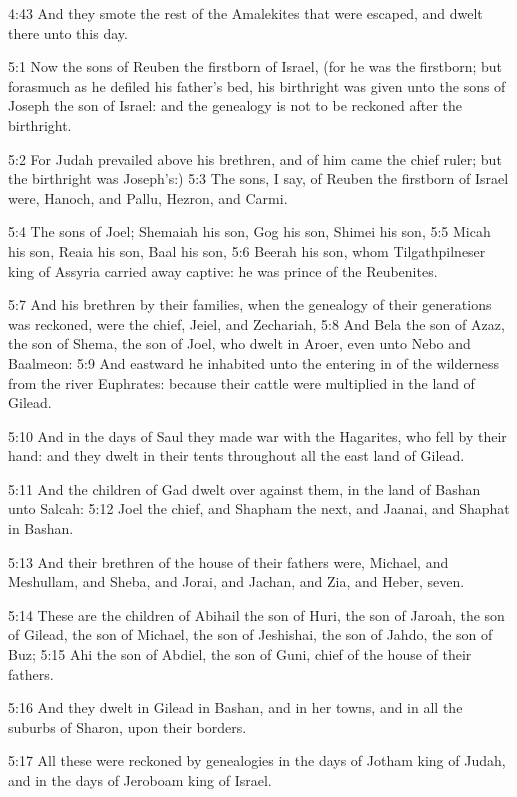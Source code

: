 4:43 And they smote the rest of the Amalekites that were escaped, and dwelt there unto this day.

5:1 Now the sons of Reuben the firstborn of Israel, (for he was the firstborn; but forasmuch as he defiled his father's bed, his birthright was given unto the sons of Joseph the son of Israel: and the genealogy is not to be reckoned after the birthright.

5:2 For Judah prevailed above his brethren, and of him came the chief ruler; but the birthright was Joseph's:) 5:3 The sons, I say, of Reuben the firstborn of Israel were, Hanoch, and Pallu, Hezron, and Carmi.

5:4 The sons of Joel; Shemaiah his son, Gog his son, Shimei his son, 5:5 Micah his son, Reaia his son, Baal his son, 5:6 Beerah his son, whom Tilgathpilneser king of Assyria carried away captive: he was prince of the Reubenites.

5:7 And his brethren by their families, when the genealogy of their generations was reckoned, were the chief, Jeiel, and Zechariah, 5:8 And Bela the son of Azaz, the son of Shema, the son of Joel, who dwelt in Aroer, even unto Nebo and Baalmeon: 5:9 And eastward he inhabited unto the entering in of the wilderness from the river Euphrates: because their cattle were multiplied in the land of Gilead.

5:10 And in the days of Saul they made war with the Hagarites, who fell by their hand: and they dwelt in their tents throughout all the east land of Gilead.

5:11 And the children of Gad dwelt over against them, in the land of Bashan unto Salcah: 5:12 Joel the chief, and Shapham the next, and Jaanai, and Shaphat in Bashan.

5:13 And their brethren of the house of their fathers were, Michael, and Meshullam, and Sheba, and Jorai, and Jachan, and Zia, and Heber, seven.

5:14 These are the children of Abihail the son of Huri, the son of Jaroah, the son of Gilead, the son of Michael, the son of Jeshishai, the son of Jahdo, the son of Buz; 5:15 Ahi the son of Abdiel, the son of Guni, chief of the house of their fathers.

5:16 And they dwelt in Gilead in Bashan, and in her towns, and in all the suburbs of Sharon, upon their borders.

5:17 All these were reckoned by genealogies in the days of Jotham king of Judah, and in the days of Jeroboam king of Israel.

